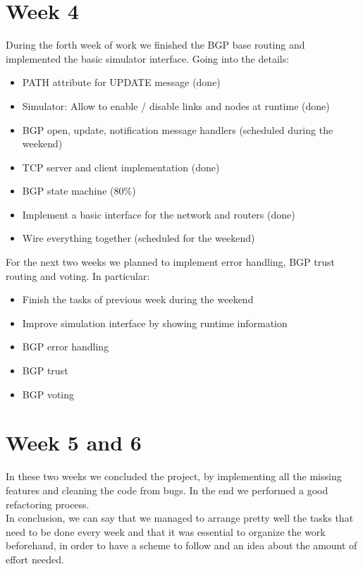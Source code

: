 \section{Week 4}
During the forth week of work we finished the BGP base routing and implemented
the basic simulator interface. Going into the details:
\begin{itemize}
    \item PATH attribute for UPDATE message (done)
    \item Simulator: Allow to enable / disable links and nodes at runtime (done)
    \item BGP open, update, notification message handlers (scheduled during the weekend)
    \item TCP server and client implementation (done)
    \item BGP state machine ($80\%$)
    \item Implement a basic interface for the network and routers (done)
    \item Wire everything together (scheduled for the weekend)
\end{itemize}

For the next two weeks we planned to implement error handling, BGP trust routing 
and voting. In particular:
\begin{itemize}
    \item Finish the tasks of previous week during the weekend
    \item Improve simulation interface by showing runtime information
    \item BGP error handling
    \item BGP trust
    \item BGP voting
\end{itemize}

\section{Week 5 and 6}
In these two weeks we concluded the project, by implementing all the missing features
and cleaning the code from bugs. In the end we performed a good refactoring process.\\
In conclusion, we can say that we managed to arrange pretty well the tasks that need to be 
done every week and that it was essential to organize the work beforehand, in order to
have a scheme to follow and an idea about the amount of effort needed.